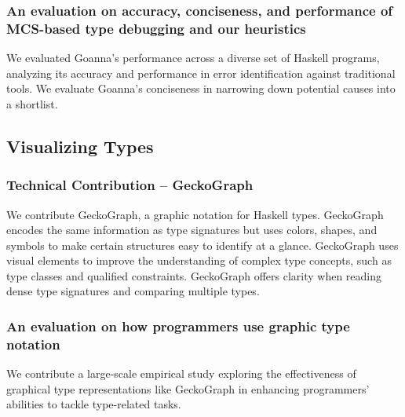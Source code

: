 \subsubsection{An evaluation on accuracy, conciseness, and performance of MCS-based type debugging and our heuristics}
We evaluated Goanna's performance across a diverse set of Haskell programs, analyzing its accuracy and performance in error identification against traditional tools. We evaluate Goanna's conciseness in narrowing down potential causes into a shortlist. 


\subsection{Visualizing Types}

\subsubsection{Technical Contribution -- GeckoGraph}

We contribute GeckoGraph, a graphic notation for Haskell types. GeckoGraph encodes the same information as type signatures but uses colors, shapes, and symbols to make certain structures easy to identify at a glance. GeckoGraph uses visual elements to improve the understanding of complex type concepts, such as type classes and qualified constraints. GeckoGraph offers clarity when reading dense type signatures and comparing multiple types.

\subsubsection{An evaluation on how programmers use graphic type notation}

We contribute a large-scale empirical study exploring the effectiveness of graphical type representations like GeckoGraph in enhancing programmers' abilities to tackle type-related tasks.




